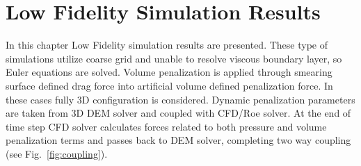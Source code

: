 \chapter{Low Fidelity Simulation Results}
\label{chapter:5}
In this chapter Low Fidelity simulation results are presented. These type of simulations utilize coarse grid and unable to resolve viscous boundary layer, so Euler equations are solved. Volume penalization is applied through smearing surface defined drag force into artificial volume defined penalization force. In these cases fully 3D configuration is considered. Dynamic penalization parameters are taken from 3D DEM solver and coupled with CFD/Roe solver. At the end of time step CFD solver calculates forces related to both pressure and volume penalization terms and passes back to DEM solver, completing two way coupling (see Fig.~\ref{fig:coupling}).

